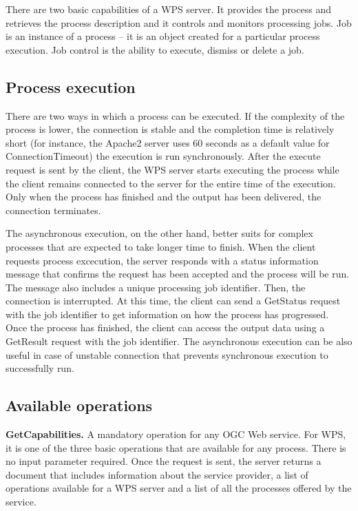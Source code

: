 There are two basic capabilities of a WPS server. It provides the process and retrieves the process description and it controls and monitors processing jobs. Job is an instance of a process – it is an object created for a particular process execution. Job control is the ability to execute, dismiss or delete a job.

\subsection{Process execution}


There are two ways in which a process can be executed. If the complexity of the process is lower, the connection is stable and the completion time is relatively short (for instance, the Apache2 server uses 60 seconds as a default value for ConnectionTimeout\cite{apache})  the execution is run synchronously. After the execute request is sent by the client, the WPS server starts executing the process while the client remains connected to the server for the entire time of the execution. Only when the process has finished and the output has been delivered, the connection terminates.

The asynchronous execution, on the other hand, better suits for complex processes that are expected to take longer time to finish. When the client requests process excecution, the server responds with a status information message that confirms the request has been accepted and the process will be run. The message also includes a unique processing job identifier. Then, the connection is interrupted. At this time, the client can send a GetStatus request with the job identifier to get information on how the process has progressed. Once the process has finished, the client can access the output data using a GetResult request with the job identifier. The asynchronous execution can be also useful in case of unstable connection that prevents synchronous execution to successfully run.

\subsection{Available operations}

\textbf{GetCapabilities.} A mandatory operation for any OGC Web service. For WPS, it is one of the three basic operations that are available for any process. There is no input parameter required. Once the request is sent, the server returns a document that includes information about the service provider, a list of operations available for a WPS server and a list of all the processes offered by the service.

